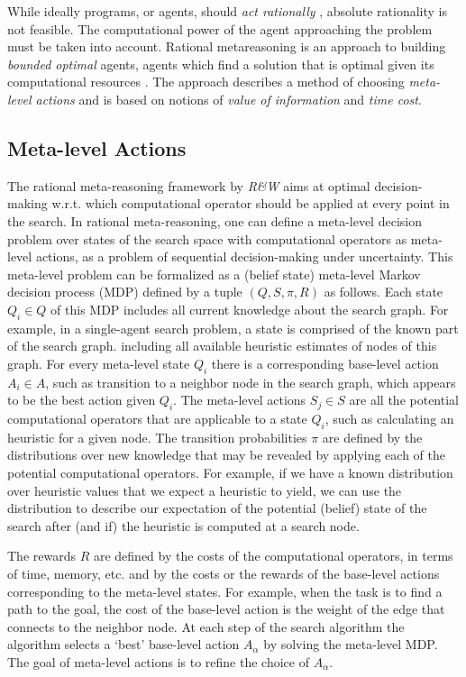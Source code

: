 While ideally programs, or agents, should {\em act rationally}
\cite{Russell.aima}, absolute rationality is not feasible. The
computational power of the agent approaching the problem must be taken
into account. Rational metareasoning \cite{Russell.right} is an
approach to building {\em bounded optimal} agents, agents which find a
solution that is optimal given its computational resources
\cite{Horvitz.reasoningabout}. The approach describes a method of
choosing {\em meta-level actions} and is based on notions of {\em
value of information} and {\em time cost}.

\subsection{Meta-level Actions}

The rational meta-reasoning framework by \emph{R\&W} aims at optimal
decision-making w.r.t. which computational operator should be applied
at every point in the search. In rational meta-reasoning, one can
define a meta-level decision problem over states of the search space
with computational operators as meta-level actions, as a problem of
sequential decision-making under uncertainty. This meta-level problem
can be formalized as a (belief state) meta-level Markov decision
process (MDP) defined by a tuple $(Q, S, \pi, R)$ as follows. Each
state $Q_i \in Q$ of this MDP includes all current knowledge about the
search graph. For example, in a single-agent search problem, a state
is comprised of the known part of the search graph. including all
available heuristic estimates of nodes of this graph. For every
meta-level state $Q_i$ there is a corresponding base-level action
$A_i \in A$, such as transition to a neighbor node in the search graph, which
appears to be the best action given $Q_i$. The
meta-level actions $S_j \in S$ are all the potential computational
operators that are applicable to a state $Q_i$, such as calculating an
heuristic for a given node. The transition probabilities $\pi$ are
defined by the distributions over new knowledge that may be revealed
by applying each of the potential computational operators.  For
example, if we have a known distribution over heuristic values that we
expect a heuristic to yield, we can use the distribution to describe
our expectation of the potential (belief) state of the search after
(and if) the heuristic is computed at a search node.

The rewards $R$ are defined by the costs of the computational
operators, in terms of time, memory, etc. and by the costs or the rewards of the
base-level actions corresponding to the meta-level states.
For example, when the task is to find a path to the goal, the cost
of the base-level action is the weight of the edge that connects to
the neighbor node. At each step of the search algorithm the algorithm selects a
`best' base-level action $A_\alpha$ by solving the meta-level MDP.
The goal of meta-level actions is to refine the choice of $A_\alpha$.

